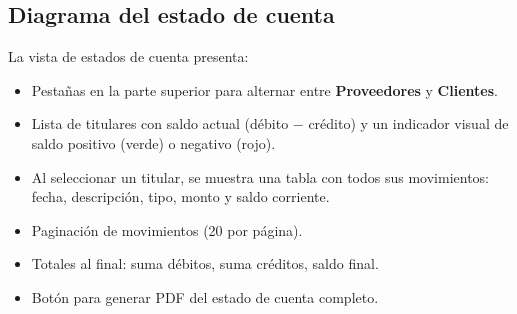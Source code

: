 \documentclass[stu]{apa7}
\begin{document}
\subsection{Diagrama del estado de cuenta}

La vista de estados de cuenta presenta:

\begin{itemize}
    \item Pestañas en la parte superior para alternar entre \textbf{Proveedores} y \textbf{Clientes}.
    \item Lista de titulares con saldo actual (débito $-$ crédito) y un indicador visual de saldo positivo (verde) o negativo (rojo).
    \item Al seleccionar un titular, se muestra una tabla con todos sus movimientos: fecha, descripción, tipo, monto y saldo corriente.
    \item Paginación de movimientos (20 por página).
    \item Totales al final: suma débitos, suma créditos, saldo final.
    \item Botón para generar PDF del estado de cuenta completo.
\end{itemize}
\end{document}
